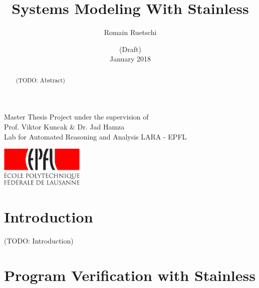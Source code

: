 \documentclass[a4paper,twoside]{article}
\title{Systems Modeling With Stainless}
\date{
  {\small (Draft)}\\
  January 2018
}
\author{Romain Ruetschi}
\makeatletter
\newcommand*{\flipmargins}{%
  \clearpage
  \setlength{\@tempdima}{\oddsidemargin}%
  \setlength{\oddsidemargin}{\evensidemargin}%
  \setlength{\evensidemargin}{\@tempdima}%
  \if@reversemargin
    \normalmarginpar
  \else
    \reversemarginpar
  \fi
}
\newcommand{\TODO}[1]{\textcolor{YellowOrange}{(TODO: #1)}} %
\makeatother
\begin{document}
\maketitle

\vfill

\begin{abstract}

\TODO{Abstract}

\end{abstract}

\vfill

\begin{center}
    Master Thesis Project under the supervision of \\
    Prof. Viktor Kuncak \& Dr. Jad Hamza \\
    Lab for Automated Reasoning and Analysis LARA - EPFL
\end{center}

\begin{center}
    \includegraphics[width = 40mm]{res/epfl-logo}
\end{center}

\clearpage\null\newpage

\restoregeometry              %
\flipmargins
\pagestyle{mystyle_no_header}

\tableofcontents

\clearpage
\pagestyle{mystyle}


\section{Introduction}

\TODO{Introduction}

\clearpage

\section{Program Verification with Stainless}
\label{verif}
\end{document}
